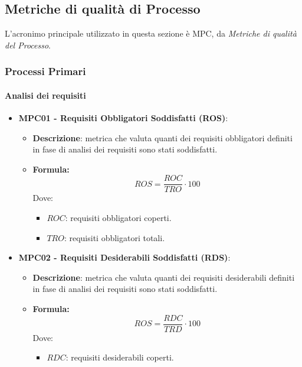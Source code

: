 \documentclass[10pt]{article}
\begin{document}
\begin{justify}
\subsection{Metriche di qualità di Processo}
L'acronimo principale utilizzato in questa sezione è MPC, da \textit{Metriche di qualità del Processo}.

\subsubsection{Processi Primari}
\paragraph{Analisi dei requisiti}
\begin{itemize}
    \item   \textbf{MPC01 - Requisiti Obbligatori Soddisfatti (ROS)}:
            \begin{itemize}
                \item   \textbf{Descrizione}: metrica che valuta quanti dei requisiti obbligatori definiti in fase di analisi dei requisiti sono stati soddisfatti.
                \item   \textbf{Formula:}
                        \[
                        ROS = \frac{ROC}{TRO} \cdot 100
                        \]
                        Dove:
                        \begin{itemize}
                            \item $ROC$: requisiti obbligatori coperti.
                            \item $TRO$: requisiti obbligatori totali.
                        \end{itemize}
            \end{itemize}
    \item   \textbf{MPC02 - Requisiti Desiderabili Soddisfatti (RDS)}:
            \begin{itemize}
                \item   \textbf{Descrizione}: metrica che valuta quanti dei requisiti desiderabili definiti in fase di analisi dei requisiti sono stati soddisfatti.
                \item   \textbf{Formula:}
                        \[
                        ROS = \frac{RDC}{TRD} \cdot 100
                        \]
                        Dove:
                        \begin{itemize}
                            \item $RDC$: requisiti desiderabili coperti.

\end{itemize}
\end{itemize}
\end{itemize}
\end{justify}
\end{document}
